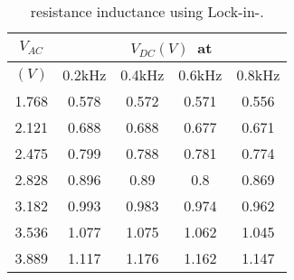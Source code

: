 \begin{table}[]
\caption{resistance inductance using Lock-in-\amp.}
\label{tab3}
\begin{tabular}{|c|c|c|c|c|}
\hline
$V_{AC}$ & \multicolumn{4}{c|}{$V_{DC}(V)$\ at} \\ \hline
$( V)$   & 0.2kHz     & 0.4kHz     & 0.6kHz     & 0.8kHz     \\ \hline
1.768    & 0.578      & 0.572      & 0.571      & 0.556      \\ \hline
2.121    & 0.688      & 0.688      & 0.677      & 0.671      \\ \hline
2.475    & 0.799      & 0.788      & 0.781      & 0.774      \\ \hline
2.828    & 0.896      & 0.89       & 0.8        & 0.869      \\ \hline
3.182    & 0.993      & 0.983      & 0.974      & 0.962      \\ \hline
3.536    & 1.077      & 1.075      & 1.062      & 1.045      \\ \hline
3.889    & 1.117      & 1.176      & 1.162      & 1.147      \\ \hline
\end{tabular}
\end{table}